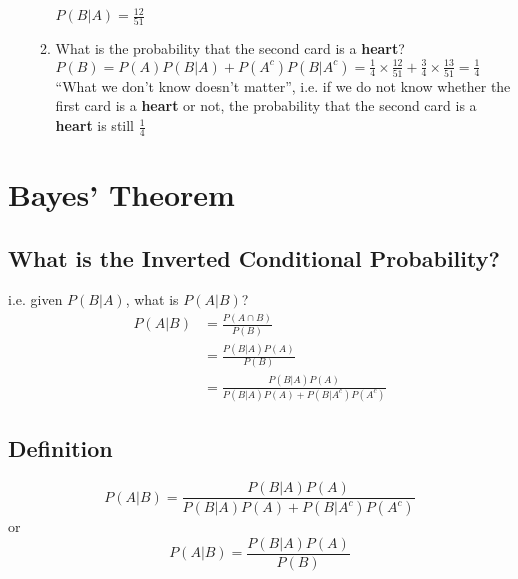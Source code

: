 \documentclass[12pt]{article}
\begin{document}
\begin{enumerate}
\begin{enumerate}
                    \\$P(B|A) = \frac{12}{51}$
                    \item What is the probability that the second card is a \textbf{heart}?
                    \\$P (B) = P (A) P (B|A) + P (A^c) P (B|A^c) = \frac{1}{4}\times\frac{12}{51} + \frac{3}{4}\times\frac{13}{51} = \frac{1}{4}$
                    \\``What we don't know doesn't matter'', i.e. if we do not know whether the first card is a \textbf{heart} or not, the probability that the second card is a \textbf{heart} is still $\frac{1}{4}$
                \end{enumerate}
            \end{enumerate}
    \section{Bayes' Theorem}
        \subsection{What is the Inverted Conditional Probability?}
            i.e. given $P (B|A)$, what is $P (A|B)$?
            \begin{align*}
                P(A|B) &= \frac{P(A \cap B)}{P(B)}\\
                &= \frac{P(B|A)P(A)}{P(B)}\\
                &= \frac{P(B|A)P(A)}{P(B|A)P(A) + P(B|A^c)P(A^c)}
            \end{align*}
        \subsection{Definition}
            \begin{equation}
                P(A|B) = \frac{P(B|A)P(A)}{P(B|A)P(A) + P(B|A^c)P(A^c)}
            \end{equation}
            or
            \begin{equation}
                P(A|B) = \frac{P(B|A)P(A)}{P(B)}
            \end{equation}
\end{document}
